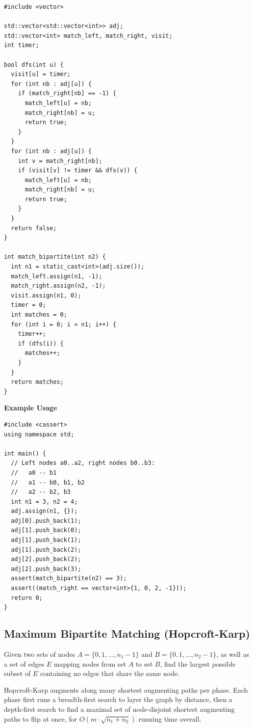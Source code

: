 \begin{lstlisting}[style=cpp]
#include <vector>

std::vector<std::vector<int>> adj;
std::vector<int> match_left, match_right, visit;
int timer;

bool dfs(int u) {
  visit[u] = timer;
  for (int nb : adj[u]) {
    if (match_right[nb] == -1) {
      match_left[u] = nb;
      match_right[nb] = u;
      return true;
    }
  }
  for (int nb : adj[u]) {
    int v = match_right[nb];
    if (visit[v] != timer && dfs(v)) {
      match_left[u] = nb;
      match_right[nb] = u;
      return true;
    }
  }
  return false;
}

int match_bipartite(int n2) {
  int n1 = static_cast<int>(adj.size());
  match_left.assign(n1, -1);
  match_right.assign(n2, -1);
  visit.assign(n1, 0);
  timer = 0;
  int matches = 0;
  for (int i = 0; i < n1; i++) {
    timer++;
    if (dfs(i)) {
      matches++;
    }
  }
  return matches;
}
\end{lstlisting}
\textbf{Example Usage}\par
\begin{lstlisting}[style=cpp]
#include <cassert>
using namespace std;

int main() {
  // Left nodes a0..a2, right nodes b0..b3:
  //   a0 -- b1
  //   a1 -- b0, b1, b2
  //   a2 -- b2, b3
  int n1 = 3, n2 = 4;
  adj.assign(n1, {});
  adj[0].push_back(1);
  adj[1].push_back(0);
  adj[1].push_back(1);
  adj[1].push_back(2);
  adj[2].push_back(2);
  adj[2].push_back(3);
  assert(match_bipartite(n2) == 3);
  assert((match_right == vector<int>{1, 0, 2, -1}));
  return 0;
}
\end{lstlisting}
\subsection{Maximum Bipartite Matching (Hopcroft-Karp)}
\label{sec:4.6.3}
Given two sets of nodes $A = \{0, 1, \ldots, n_1 - 1\}$ and $B = \{0, 1, \ldots, n_2 - 1\}$, as well as a set of edges $E$ mapping nodes from set $A$ to set $B$, find the largest possible subset of $E$ containing no edges that share the same node.

Hopcroft-Karp augments along many shortest augmenting paths per phase. Each phase first runs a breadth-first search to layer the graph by distance, then a depth-first search to find a maximal set of node-disjoint shortest augmenting paths to flip at once, for $O(m \cdot \sqrt{n_1 + n_2})$ running time overall.

